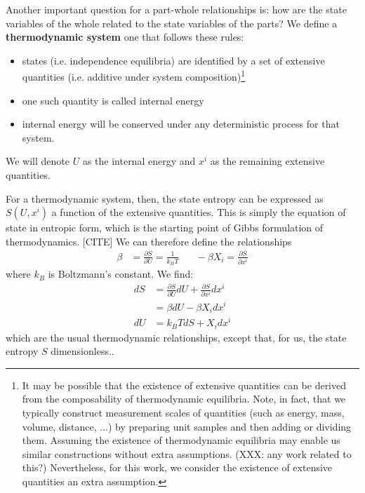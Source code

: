 \documentclass[letterpaper,twocolumn]{article}
\begin{document}
Another important question for a part-whole relationships is: how are the state variables of the whole related to the state variables of the parts? We define a \textbf{thermodynamic system} one that follows these rules: 
\begin{itemize}
	\item states (i.e. independence equilibria) are identified by a set of extensive quantities (i.e. additive under system composition)\footnote{It may be possible that the existence of extensive quantities can be derived from the composability of thermodynamic equilibria. Note, in fact, that we typically construct measurement scales of quantities (such as energy, mass, volume, distance, ...) by preparing unit samples and then adding or dividing them. Assuming the existence of thermodynamic equilibria may enable us similar constructions without extra assumptions. (XXX: any work related to this?) Nevertheless, for this work, we consider the existence of extensive quantities an extra assumption.
	}
	\item one such quantity is called internal energy
	\item internal energy will be conserved under any deterministic process for that system.
\end{itemize}
We will denote $U$ as the internal energy and $x^i$ as the remaining extensive quantities.

For a thermodynamic system, then, the state entropy can be expressed as $S(U, x^i)$ a function of the extensive quantities. This is simply the equation of state in entropic form, which is the starting point of Gibbs formulation of thermodynamics. [CITE] We can therefore define the relationships
\begin{align}
	\beta &= \frac{\partial S}{\partial U} = \frac{1}{k_B T} \;\;\;\;\;\; - \beta X_i = \frac{\partial S}{\partial x^i}
\end{align}
where $k_B$ is Boltzmann's constant. We find:
\begin{align}
dS &= \frac{\partial S}{\partial U} dU + \frac{\partial S}{\partial x^i} dx^i \\
&= \beta dU - \beta X_i dx^i \\
dU &= k_B T dS + X_i dx^i
\end{align}
which are the usual thermodynamic relationships, except that, for us, the state entropy $S$ dimensionless..
\end{document}
